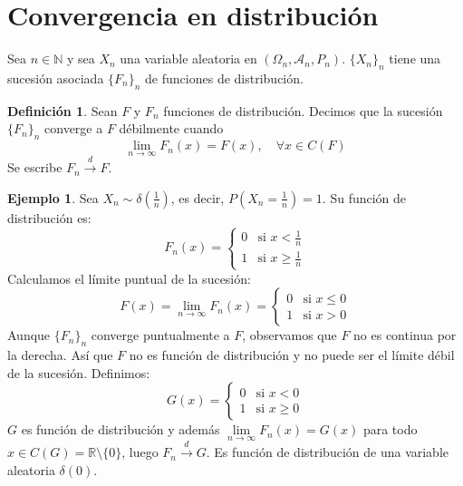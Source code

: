 \documentclass{report}
\theoremstyle{remark}
\theoremstyle{remark}
\theoremstyle{remark}
\theoremstyle{definition}
\newtheorem{definition}{Definición}[chapter]
\theoremstyle{definition}
\theoremstyle{definition}
\newtheorem*{example}{Ejemplo}
\theoremstyle{definition}
\begin{document}
\section{Convergencia en distribución}

Sea $n \in \mathbb{N}$ y sea $X_n$ una variable aleatoria en $(\Omega_n, \mathcal{A}_n, P_n)$.
$\{X_n\}_n$ tiene una sucesión asociada $\{F_n\}_n$ de funciones de distribución.

\begin{definition}
    Sean $F$ y $F_n$ funciones de distribución.
    Decimos que la sucesión $\{F_n\}_n$ converge a $F$ débilmente cuando
    $$\lim\limits_{n \to \infty} F_n(x) = F(x), \quad \forall x \in C(F)$$
    Se escribe $F_n \xrightarrow{d} F$.
\end{definition}

\begin{example}
    Sea $X_n \sim \delta(\frac{1}{n})$, es decir, $P(X_n = \frac{1}{n}) = 1$.
    Su función de distribución es:
    $$F_n(x) = \begin{cases}
            0 & \text{si } x < \frac{1}{n}    \\
            1 & \text{si } x \geq \frac{1}{n}
        \end{cases}$$
    Calculamos el límite puntual de la sucesión:
    $$F(x) = \lim\limits_{n \to \infty} F_n(x) = \begin{cases}
            0 & \text{si } x \leq 0 \\
            1 & \text{si } x > 0
        \end{cases}$$
    Aunque $\{F_n\}_n$ converge puntualmente a $F$, observamos que $F$ no es continua por la derecha.
    Así que $F$ no es función de distribución y no puede ser el límite débil de la sucesión.
    Definimos:
    $$G(x) = \begin{cases}
            0 & \text{si } x < 0    \\
            1 & \text{si } x \geq 0
        \end{cases}$$
    $G$ es función de distribución y además $\lim\limits_{n \to \infty} F_n(x) = G(x)$ para todo $x \in C(G) = \mathbb{R} \setminus \{0\}$, luego $F_n \xrightarrow{d} G$.
    Es función de distribución de una variable aleatoria $\delta(0)$.
\end{example}
\end{document}
